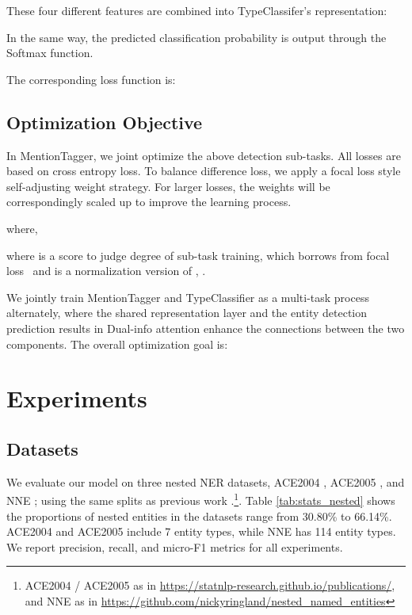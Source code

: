 \documentclass[11pt,a4paper]{article}
\begin{document}
These four different features are combined into TypeClassifer's representation:


In the same way, the predicted classification probability is output through the Softmax function.


The corresponding loss function  is:



\subsection{Optimization Objective}
\label{subsec:optimizationobjective}

In MentionTagger, we joint optimize the above detection sub-tasks. 
All losses are based on cross entropy loss. To balance difference loss, we apply a focal loss style self-adjusting weight strategy.
For larger losses, the weights will be correspondingly scaled up to improve the learning process.

where, 

where  is a score to judge degree of sub-task training, which borrows from focal loss~\cite{lin2017focalloss}
and  is a normalization version of ,  .

We jointly train MentionTagger and TypeClassifier as a multi-task process alternately, where the shared representation layer and the entity detection prediction results in Dual-info attention enhance the connections between the two components.
The overall optimization goal is:

 
\section{Experiments}
\label{sec:Experiments}

\subsection{Datasets}
\label{sec:datasets}

We evaluate our model on three nested NER datasets, ACE2004 \cite{doddington2004automatic}, ACE2005 \cite{walker2006ace}, and NNE \cite{dblp2019nne}; using the same splits as previous work \cite{lu2015joint,wang2018neural,lin2019sequence,dblp2019nne}.\footnote{ACE2004 / ACE2005 as in \url{https://statnlp-research.github.io/publications/}, and NNE as in \url{https://github.com/nickyringland/nested_named_entities}}.
Table \ref{tab:stats_nested} shows the proportions of nested entities in the datasets range from 30.80\% to 66.14\%. ACE2004 and ACE2005 include 7 entity types, while NNE has 114 entity types.
We report precision, recall, and micro-F1 metrics for all experiments.
\end{document}
